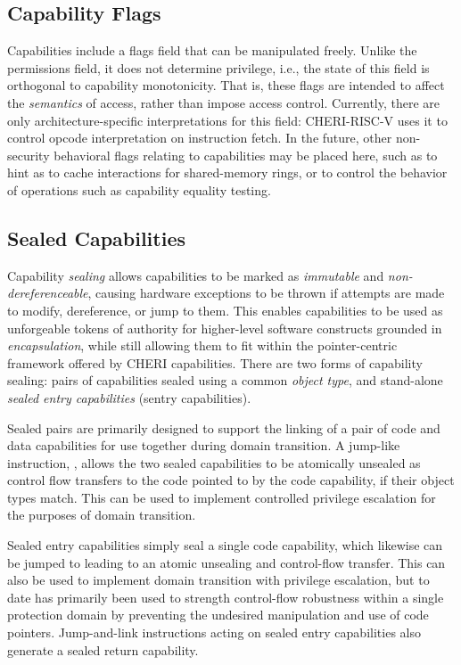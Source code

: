 \subsection{Capability Flags}
\label{sec:model-flags}
Capabilities include a flags field that can be manipulated freely.
Unlike the permissions field, it does not determine privilege, i.e., the state
of this field is orthogonal to capability monotonicity.
%
That is, these flags are intended to affect the \emph{semantics} of access,
rather than impose access control.
%
Currently, there are only architecture-specific interpretations for this
field: CHERI-RISC-V uses it to control opcode interpretation on instruction
fetch.
In the future, other non-security behavioral flags relating to capabilities may
be placed here, such
as to hint as to cache interactions for shared-memory rings, or to control
the behavior of operations such as capability equality testing.

\subsection{Sealed Capabilities}
\label{sec:model-sealedcapabilities}

Capability \textit{sealing} allows capabilities to be marked as
\textit{immutable} and \textit{non-deref\-erenceable}, causing hardware
exceptions to be thrown if attempts are made to modify, dereference, or jump
to them.
This enables capabilities to be used as unforgeable tokens of authority for
higher-level software constructs grounded in \textit{encapsulation}, while
still allowing them to fit within the pointer-centric framework offered by CHERI
capabilities.
There are two forms of capability sealing: pairs of capabilities sealed
using a common \textit{object type}, and stand-alone \textit{sealed entry
capabilities} (sentry capabilities).

Sealed pairs are primarily designed to support the linking of a pair of code
and data capabilities for use together during domain transition.
A jump-like instruction, , allows the two sealed
capabilities to be atomically unsealed as control flow transfers to the code
pointed to by the code capability, if their object types match.
This can be used to implement controlled privilege escalation for the purposes
of domain transition.

Sealed entry capabilities simply seal a single code capability, which likewise
can be jumped to leading to an atomic unsealing and control-flow transfer.
This can also be used to implement domain transition with privilege
escalation, but to date has primarily been used to strength control-flow
robustness within a single protection domain by preventing the undesired
manipulation and use of code pointers.
Jump-and-link instructions acting on sealed entry capabilities also generate
a sealed return capability.

